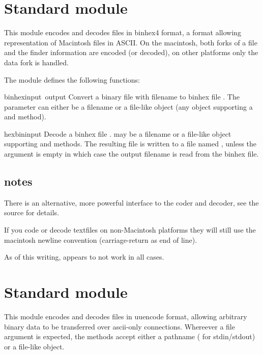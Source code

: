 \section{Standard module }

This module encodes and decodes files in binhex4 format, a format
allowing representation of Macintosh files in ASCII. On the macintosh,
both forks of a file and the finder information are encoded (or
decoded), on other platforms only the data fork is handled.

The  module defines the following functions:

\renewcommand{\indexsubitem}{(in module binhex)}

\begin{funcdesc}{binhex}{input\, output}
Convert a binary file with filename  to binhex file
. The  parameter can either be a filename or a
file-like object (any object supporting a  and 
method).
\end{funcdesc}

\begin{funcdesc}{hexbin}{input}
Decode a binhex file .  may be a filename or a
file-like object supporting  and  methods.
The resulting file is written to a file named , unless the
argument is empty in which case the output filename is read from the
binhex file.
\end{funcdesc}

\subsection{notes}
There is an alternative, more powerful interface to the coder and
decoder, see the source for details.

If you code or decode textfiles on non-Macintosh platforms they will
still use the macintosh newline convention (carriage-return as end of
line).

As of this writing,  appears to not work in all cases.

\section{Standard module }

This module encodes and decodes files in uuencode format, allowing
arbitrary binary data to be transferred over ascii-only connections.
Whereever a file argument is expected, the methods accept either a
pathname ( for stdin/stdout) or a file-like object.

